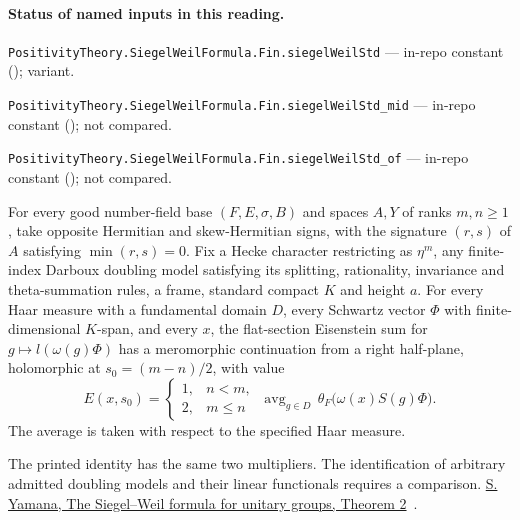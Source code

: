 

\paragraph{Status of named inputs in this reading.}
\noindent\nolinkurl{PositivityTheory.SiegelWeilFormula.Fin.siegelWeilStd} --- in-repo constant (); variant.\par
\noindent\nolinkurl{PositivityTheory.SiegelWeilFormula.Fin.siegelWeilStd_mid} --- in-repo constant (); not compared.\par
\noindent\nolinkurl{PositivityTheory.SiegelWeilFormula.Fin.siegelWeilStd_of} --- in-repo constant (); not compared.\par

\begin{formalstatement}\label{sub:T12}

For every good number-field base $(F,E,\sigma,B)$ and spaces $A,Y$ of
ranks $m,n\ge1$, take opposite Hermitian and skew-Hermitian signs, with the
signature $(r,s)$ of $A$ satisfying $\min(r,s)=0$. Fix a Hecke character
restricting as $\eta^m$, any finite-index Darboux doubling model satisfying
its splitting, rationality, invariance and theta-summation rules, a frame,
standard compact $K$ and height $a$. For every Haar measure with a
fundamental domain $D$, every Schwartz vector $\Phi$ with finite-dimensional
$K$-span, and every $x$, the flat-section Eisenstein sum for
$g\mapsto l(\omega(g)\Phi)$ has a meromorphic continuation from a right
half-plane, holomorphic at $s_0=(m-n)/2$, with value
\[
 E(x,s_0)=
 \begin{cases}1,&n<m,\\2,&m\le n\end{cases}
 \ \mathop{\mathrm{avg}}_{g\in D}\,
       \theta_F\bigl(\omega(x)S(g)\Phi\bigr).
\]
The average is taken with respect to the specified Haar measure.

\end{formalstatement}

\noindent The printed identity has the same two multipliers. The identification of arbitrary admitted doubling models and their linear functionals requires a comparison. \href{https://msp.org/pjm/2013/264-1/pjm-v264-n1-p11-p.pdf}{S. Yamana, The Siegel–Weil formula for unitary groups, Theorem 2}~\cite{r21-yamana}.
